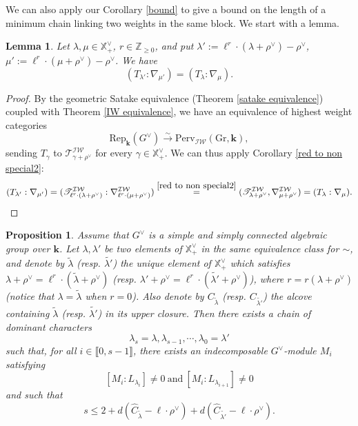 \documentclass[11pt]{amsart}
\theoremstyle{plain}
\newtheorem{lem}[thm]{Lemma}
\newtheorem{prop}[thm]{Proposition}
\theoremstyle{remark}
\numberwithin{equation}{section}
\begin{document}
We can also apply our Corollary \ref{bound} to give a bound on the length of a minimum chain linking two weights in the same block. We start with a lemma.
	\begin{lem}\label{lem dilation}
		Let $\lambda,\mu\in \mathbb{X}_+^\vee$, $r\in\mathbb{Z}_{\geq0}$, and put $\lambda':=\ell^r\cdot(\lambda+\rho^\vee)-\rho^\vee$, $\mu':=\ell^r\cdot(\mu+\rho^\vee)-\rho^\vee$. We have 
		$$(T_{\lambda'}:\nabla_{\mu'})= (T_{\lambda}:\nabla_{\mu}).$$
	\end{lem}
	\begin{proof}
		By the geometric Satake equivalence (Theorem \ref{satake equivalence}) coupled with Theorem \ref{IW equivalence}, we have an equivalence of highest weight categories $$\mathrm{Rep}_\mathbf{k}(G^\vee)\xrightarrow{\sim}\mathrm{Perv}_{\mathcal{IW}}(\mathrm{Gr},\mathbf{k}),$$
		sending $T_\gamma$ to $\mathscr{T}^\mathcal{IW}_{\gamma+\rho^\vee}$ for every $\gamma\in\mathbb{X}^\vee_+$. We can thus apply Corollary \ref{red to non special2}:
		$$(T_{\lambda'}:\nabla_{\mu'})=(\mathscr{T}^\mathcal{IW}_{\ell^r\cdot(\lambda+\rho^\vee)}:\nabla^\mathcal{IW}_{\ell^r\cdot (\mu+\rho^\vee)})\overset{\ref{red to non special2}}{=}(\mathscr{T}^\mathcal{IW}_{\lambda+\rho^\vee},\nabla^\mathcal{IW}_{\mu+\rho^\vee} )= (T_{\lambda}:\nabla_{\mu}).$$
	\end{proof}
	\begin{prop}\label{bound group}
		Assume that $G^\vee$ is a simple and simply connected algebraic group over $\mathbf{k}$. Let $\lambda,\lambda'$ be two elements of $\mathbb{X}^\vee_+$ in the same equivalence class for $\sim$, and denote by $\tilde{\lambda}$ (resp. $\tilde{\lambda'}$) the unique element of $\mathbb{X}^\vee_+$ which satisfies $\lambda+\rho^\vee=\ell^r\cdot(\tilde{\lambda}+\rho^\vee)$ (resp. $\lambda'+\rho^\vee=\ell^r\cdot(\tilde{\lambda'}+\rho^\vee)$), where $r=r(\lambda+\rho^\vee)$ (notice that $\lambda=\tilde{\lambda}$ when $r=0$). Also denote by $C_{\tilde{\lambda}}$ (resp. $C_{\tilde{\lambda'}}$) the alcove containing ${\tilde{\lambda}}$ (resp. ${\tilde{\lambda'}}$) in its upper closure. Then there exists a chain of dominant characters 
		$$\lambda_s=\lambda,\lambda_{s-1},\cdots,\lambda_0=\lambda' $$
		such that, for all $i\in\llbracket 0,s-1\rrbracket$, there exists an indecomposable $G^\vee$-module $M_i$ satisfying
		$$[M_i:L_{\lambda_i}]\neq 0~\text{and}~[M_i:L_{\lambda_{i+1}}]\neq 0 $$
		and such that 
		$$s\leq 2+d(\hat{C}_{\tilde{\lambda}}-\ell\cdot\rho^\vee)+d(\hat{C}_{\tilde{\lambda'}}-\ell\cdot\rho^\vee). $$
		
	\end{prop}
\end{document}
